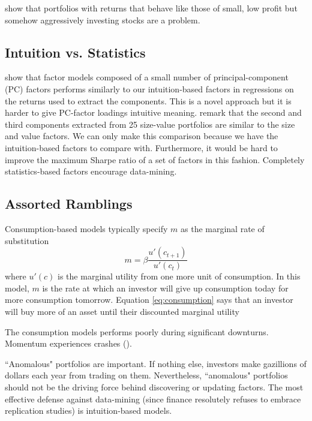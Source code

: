 \textcite{fama2015five, fama2016choosing, fama2017international} show that portfolios with 
returns that behave like those of small, low profit but somehow aggressively investing stocks 
are a problem.

\subsection{Intuition vs. Statistics}

\textcite{kozak2017interpreting} show that factor models composed of a small number of 
principal-component (PC) factors performs similarly to our intuition-based factors in 
regressions on the returns used to extract the components.
This is a novel approach but it is harder to give PC-factor loadings intuitive meaning.
\textcite{kozak2017interpreting} remark that the second and third components extracted from 25 
size-value portfolios are similar to the size and value factors.
We can only make this comparison because we have the intuition-based factors to compare with.
Furthermore, it would be hard to improve the maximum Sharpe ratio of a set of factors in this 
fashion.
Completely statistics-based factors encourage data-mining.

\subsection{Assorted Ramblings}

Consumption-based models typically specify $m$ as the marginal rate of 
substitution
\begin{equation}
\label{eq:consumption}
m=\beta\frac{u'(c_{t+1})}{u'(c_t)}
\end{equation}
where $u'(c)$ is the marginal utility from one more unit of consumption.
In this model, $m$ is the rate at which an investor will give up consumption 
today for more consumption tomorrow.
Equation \ref{eq:consumption} says that an investor will buy more of an asset 
until their discounted marginal utility

The consumption models performs poorly during significant downturns.
Momentum experiences crashes (\parencite{daniel2016momentum}).

``Anomalous" portfolios are important.
If nothing else, investors make gazillions of dollars each year from trading 
on them.
Nevertheless, ``anomalous" portfolios should not be the driving force behind 
discovering or updating factors.
The most effective defense against data-mining (since finance resolutely 
refuses to embrace replication studies) is intuition-based models.

